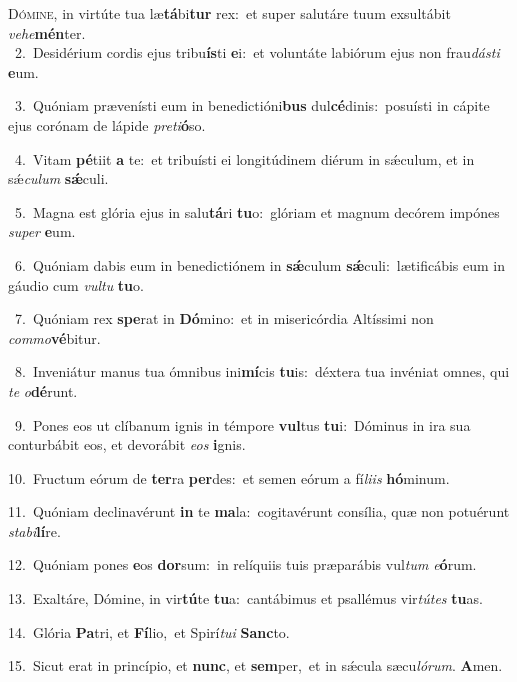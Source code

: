 \lettrine{\initial\textcolor{\initialcolor}{D}}{ómine,} in virtúte tua læ\-\textbf{tá}\-bi\textbf{tur} rex:~\star et super salutáre tuum exsultábit \textit{ve}\-\textit{he}\textbf{mén}ter.\\
{\numbfont\textcolor{\numbcolor}{~2.}}~Desidérium cordis ejus tribu\-\textbf{ís}\-ti \textbf{e}\-i:~\star et voluntáte labiórum ejus non frau\-\textit{dás}\-\textit{ti} \textbf{e}\-um.\par
{\numbfont\textcolor{\numbcolor}{~3.}}~Quóniam prævenísti eum in benedictióni\textbf{bus} dul\-\textbf{cé}\-dinis:~\star posuísti in cápite ejus corónam de lápide \textit{pre}\-\textit{ti}\textbf{ó}so.\par
{\numbfont\textcolor{\numbcolor}{~4.}}~Vitam \textbf{pé}\-tiit \textbf{a} te:~\star et tribuísti ei longitúdinem diérum in sǽculum, et in sǽ\-\textit{cu}\-\textit{lum} \textbf{sǽ}\-culi.\par
{\numbfont\textcolor{\numbcolor}{~5.}}~Magna est glória ejus in salu\-\textbf{tá}\-ri \textbf{tu}\-o:~\star glóriam et magnum decórem impónes \textit{su}\-\textit{per} \textbf{e}\-um.\par
{\numbfont\textcolor{\numbcolor}{~6.}}~Quóniam dabis eum in benedictiónem in \textbf{sǽ}\-culum \textbf{sǽ}\-culi:~\star lætificábis eum in gáudio cum \textit{vul}\-\textit{tu} \textbf{tu}\-o.\par
{\numbfont\textcolor{\numbcolor}{~7.}}~Quóniam rex \textbf{spe}\-rat in \textbf{Dó}\-mino:~\star et in misericórdia Altíssimi non \textit{com}\-\textit{mo}\textbf{vé}bitur.\par
{\numbfont\textcolor{\numbcolor}{~8.}}~Inveniátur manus tua ómnibus ini\-\textbf{mí}\-cis \textbf{tu}\-is:~\star déxtera tua invéniat omnes, qui \textit{te} \textit{o}\-\textbf{dé}runt.\par
{\numbfont\textcolor{\numbcolor}{~9.}}~Pones eos ut clíbanum ignis in témpore \textbf{vul}\-tus \textbf{tu}\-i:~\star Dóminus in ira sua conturbábit eos, et devorábit \textit{e}\-\textit{os} \textbf{i}\-gnis.\par
{\numbfont\textcolor{\numbcolor}{10.}}~Fructum eórum de \textbf{ter}\-ra \textbf{per}\-des:~\star et semen eórum a fí\-\textit{li}\-\textit{is} \textbf{hó}\-minum.\par
{\numbfont\textcolor{\numbcolor}{11.}}~Quóniam declinavérunt \textbf{in} te \textbf{ma}\-la:~\star cogitavérunt consília, quæ non potuérunt \textit{sta}\-\textit{bi}\textbf{lí}re.\par
{\numbfont\textcolor{\numbcolor}{12.}}~Quóniam pones \textbf{e}\-os \textbf{dor}\-sum:~\star in relíquiis tuis præparábis vul\textit{tum} \textit{e}\-\textbf{ó}rum.\par
{\numbfont\textcolor{\numbcolor}{13.}}~Exaltáre, Dómine, in vir\-\textbf{tú}\-te \textbf{tu}\-a:~\star cantábimus et psallémus vir\-\textit{tú}\-\textit{tes} \textbf{tu}\-as.\par
{\numbfont\textcolor{\numbcolor}{14.}}~Glória \textbf{Pa}\-tri, et \textbf{Fí}\-lio,~\star et Spirí\-\textit{tu}\-\textit{i} \textbf{Sanc}\-to.\par
{\numbfont\textcolor{\numbcolor}{15.}}~Sicut erat in princípio, et \textbf{nunc}\-, et \textbf{sem}\-per,~\star et in sǽcula sæcu\-\textit{ló}\-\textit{rum}. \textbf{A}\-men.\par

